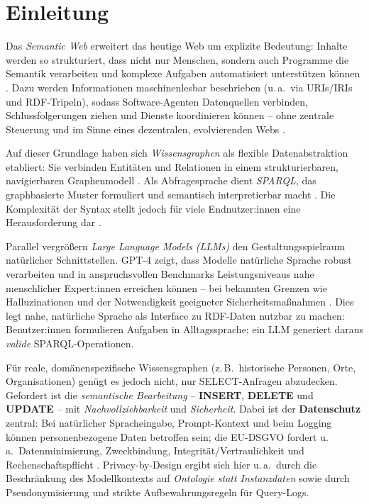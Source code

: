 

\chapter{Einleitung}\label{sec:Einleitung}

Das \emph{Semantic Web} erweitert das heutige Web um explizite Bedeutung: Inhalte werden so strukturiert, dass nicht nur Menschen, sondern auch Programme die Semantik verarbeiten und komplexe Aufgaben automatisiert unterstützen können \cite{bernersLee2001}. Dazu werden Informationen maschinenlesbar beschrieben (u.\,a.\ via URIs/IRIs und RDF-Tripeln), sodass Software-Agenten Datenquellen verbinden, Schlussfolgerungen ziehen und Dienste koordinieren können – ohne zentrale Steuerung und im Sinne eines dezentralen, evolvierenden Webs \cite{bernersLee2001}.

Auf dieser Grundlage haben sich \emph{Wissensgraphen} als flexible Datenabstraktion etabliert: Sie verbinden Entitäten und Relationen in einem strukturierbaren, navigierbaren Graphenmodell \cite{hogan2021}. Als Abfragesprache dient \emph{SPARQL}, das graphbasierte Muster formuliert und semantisch interpretierbar macht \cite{w3cSparql11}. Die Komplexität der Syntax stellt jedoch für viele Endnutzer:innen eine Herausforderung dar \cite{perezGutierrezSparql}.

Parallel vergrößern \emph{Large Language Models (LLMs)} den Gestaltungsspielraum natürlicher Schnittstellen. GPT-4 zeigt, dass Modelle natürliche Sprache robust verarbeiten und in anspruchsvollen Benchmarks Leistungsniveaus nahe menschlicher Expert:innen erreichen können – bei bekannten Grenzen wie Halluzinationen und der Notwendigkeit geeigneter Sicherheitsmaßnahmen \cite{openaiGPT42023}. Dies legt nahe, natürliche Sprache als Interface zu RDF-Daten nutzbar zu machen: Benutzer:innen formulieren Aufgaben in Alltagssprache; ein LLM generiert daraus \emph{valide} SPARQL-Operationen.

Für reale, domänenspezifische Wissensgraphen (z.\,B.\ historische Personen, Orte, Organisationen) genügt es jedoch nicht, nur SELECT-Anfragen abzudecken. Gefordert ist die \emph{semantische Bearbeitung} – \textbf{INSERT}, \textbf{DELETE} und \textbf{UPDATE} – mit \emph{Nachvollziehbarkeit} und \emph{Sicherheit}. Dabei ist der \textbf{Datenschutz} zentral: Bei natürlicher Spracheingabe, Prompt-Kontext und beim Logging können personenbezogene Daten betroffen sein; die EU-DSGVO fordert u.\,a.\ Datenminimierung, Zweckbindung, Integrität/Vertraulichkeit und Rechenschaftspflicht \cite{euGDPR2016}. Privacy-by-Design ergibt sich hier u.\,a.\ durch die Beschränkung des Modellkontexts auf \emph{Ontologie statt Instanzdaten} sowie durch Pseudonymisierung und strikte Aufbewahrungsregeln für Query-Logs.

